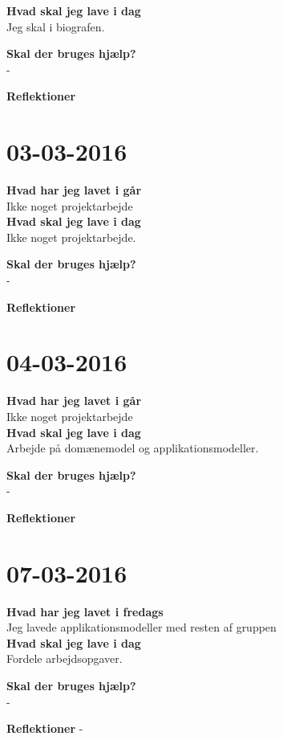 \documentclass{article}
\begin{document}
	\textbf{Hvad skal jeg lave i dag}\\
	Jeg skal i biografen.    
	
	\textbf{Skal der bruges hjælp?}\\
	-
	
	\textbf{Reflektioner}
	
	
	\section{03-03-2016}
	
	\textbf{Hvad har jeg lavet i går}\\
	Ikke noget projektarbejde\\
	
	\textbf{Hvad skal jeg lave i dag}\\
	Ikke noget projektarbejde.    
	
	\textbf{Skal der bruges hjælp?}\\
	-
	
	\textbf{Reflektioner}
	
	
	\section{04-03-2016}
	
	\textbf{Hvad har jeg lavet i går}\\
	Ikke noget projektarbejde\\
	
	\textbf{Hvad skal jeg lave i dag}\\
	Arbejde på domænemodel og applikationsmodeller.    
	
	\textbf{Skal der bruges hjælp?}\\
	-
	
	\textbf{Reflektioner}
	
	
	\section{07-03-2016}
	
	\textbf{Hvad har jeg lavet i fredags}\\
	Jeg lavede applikationsmodeller med resten af gruppen\\
	
	\textbf{Hvad skal jeg lave i dag}\\
	Fordele arbejdsopgaver.     
	
	\textbf{Skal der bruges hjælp?}\\
	- 
	
	\textbf{Reflektioner}
	-
	
\end{document}
